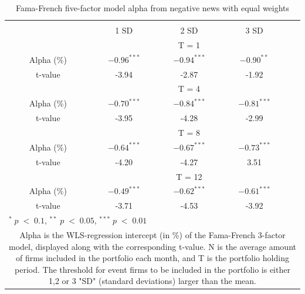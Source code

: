 \setlength{\tabcolsep}{15pt}
\begin{table}[]
\small
\centering
\caption{Fama-French five-factor model alpha from negative news with equal weights} 
\begin{tabular}{ccccccc}
\hline \hline \\ 
 &     &  &    1 SD  &  2 SD  &  3 SD  &  \\ \cline{4-6} 
& & & \multicolumn{3}{c}{ T = 1} & \\ \cline{2-6}
& Alpha (\%)  &  & $-0.96^{***}$  & $-0.94^{***}$  & $-0.90^{**}$ &  \\
& t-value &  & -3.94 & -2.87  & -1.92 & \\
& & & \multicolumn{3}{c}{ T = 4} & \\ \cline{2-6}
& Alpha (\%)  &  & $-0.70^{***}$  & $-0.84^{***}$  &  $-0.81^{***}$ & \\
& t-value & & -3.95 & -4.28 & -2.99 & \\
& & & \multicolumn{3}{c}{ T = 8} & \\ \cline{2-6}
& Alpha (\%)  &  & $-0.64^{***}$   & $-0.67^{***}$  & $-0.73^{***}$ &  \\
& t-value &  & -4.20  & -4.27 & 3.51 & \\
&  & & \multicolumn{3}{c}{ T = 12} & \\ \cline{2-6}
& Alpha (\%)  &  & $-0.49^{***}$  & $-0.62^{***}$  & $-0.61^{***}$ &  \\
& t-value &  & -3.71  & -4.53 & -3.92 & \\
\hline \hline
 \multicolumn{7}{l}{ \footnotesize $^* \; p\; <\; 0.1$, $ ^{**} \; p\; <\; 0.05$, $ ^{***} \; p\; <\; 0.01$  } \\
 \multicolumn{7}{p{11.5cm}}{ \footnotesize Alpha is the WLS-regression intercept (in \%) of the Fama-French 3-factor model, displayed along with the corresponding t-value. N is the average amount of firms included in the portfolio each month, and T is the portfolio holding period. The threshold for event firms to be included in the portfolio is either 1,2 or 3 "SD" (standard deviations) larger than the mean.}  \\ 
\end{tabular}
\label{tab: FF3-pos}
\end{table}






